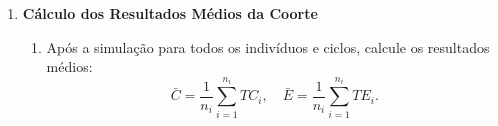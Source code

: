 \documentclass[12pt, a4paper, openany]{book}
\numberwithin{equation}{chapter}
\numberwithin{table}{chapter}
\numberwithin{figure}{chapter}
\theoremstyle{break}
\begin{document}
\begin{enumerate}
\begin{enumerate}[label=\alph*)]
\begin{enumerate}[label=\roman*)]
\begin{enumerate}[label=\alph*)]
                \begin{itemize}
                    \item Determine o custo imediato $c_{it}$ e o benéficio $QALY_{it}$, considerando o estado $M_{it}$, o tratamento $Trt_i$ e a heterogeneidade $\gamma_i$.
                    \item Aplique os fatores de desconto:
                    \[
                    c_{it}^{\text{desc}} = c_{it} \times \frac{1}{(1 + d_c)^t}, \quad QALY_{it}^{\text{desc}} = QALY_{it}\times \frac{1}{(1 + d_e)^t}.
                    \]
                \end{itemize}
                \item \textbf{Atualização dos Acumulados}:
                \begin{itemize}
                    \item Atualize os valores acumulados até o ciclo $n$:
                    \[
                    TC_i = \sum_{t = 0}^nc_i^{\text{desc}} , \quad TE_i =   \sum_{t = 0}^nQALY_{it}^{\text{desc}}.
                    \]
                \end{itemize}
                \item \textbf{Atualização da Duração}:
                \begin{itemize}
                    \item Atualize a duração nos estados doentes:
                    \[
                    dur_i(t) =
                    \begin{cases}
                        dur_i(t-1) + 1, & \text{se } M_{it} \in \{S1, S2\} \\
                        0,              & \text{caso contrário}.
                    \end{cases}
                    \]
                \end{itemize}
            \end{enumerate}
        \end{enumerate}
    \end{enumerate}
    
    \item \textbf{Cálculo dos Resultados Médios da Coorte}
    \begin{enumerate}[label=\alph*)]
        \item Após a simulação para todos os indivíduos e ciclos, calcule os resultados médios:
        \[
        \bar{C} = \frac{1}{n_i} \sum_{i=1}^{n_i} TC_i, \quad \bar{E} = \frac{1}{n_i} \sum_{i=1}^{n_i} TE_i.
        \]
    \end{enumerate}
\end{enumerate}
\end{document}
